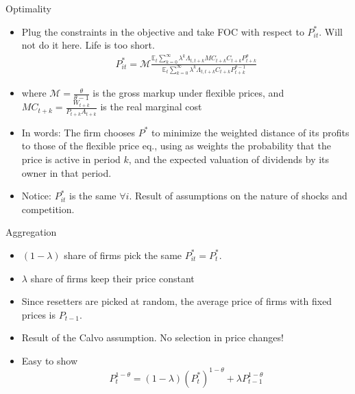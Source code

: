 \documentclass[11pt,aspectratio=169,xcolor={dvipsnames},hyperref={pdftex,pdfpagemode=UseNone,hidelinks,pdfdisplaydoctitle=true},usepdftitle=false]{beamer}
\begin{document}
\begin{frame}{Optimality}
\begin{itemize}
\item Plug the constraints in the objective and take FOC with respect to $P_{it}^*$. Will not do it here. Life is too short.
\begin{align*}
P^*_{it} = \mathcal{M} \frac{\mathbb{E}_t \sum_{k=0}^{\infty} \lambda^k \Lambda_{t,t+k} MC_{t+k} C_{t+k} P_{t+k}^{\theta}}{\mathbb{E}_t \sum_{k=0}^{\infty} \lambda^k \Lambda_{t,t+k} C_{t+k} P_{t+k}^{\theta-1}}
\end{align*}
\pause
\item where $\mathcal{M} = \frac{\theta}{\theta-1}$ is the gross markup under flexible prices, and $MC_{t+k} = \frac{W_{t+k}}{P_{t+k} A_{t+k}}$ is the real marginal cost
\item In words: The firm chooses $P^*$ to minimize the weighted distance of its profits to those of the flexible price eq., using as weights the probability that the price is active in period $k$, and the expected valuation of dividends by its owner in that period.
\pause
\item Notice: $P^*_{it}$ is the same $\forall i$. Result of assumptions on the nature of shocks and competition.
\end{itemize}
\end{frame}

\begin{frame}{Aggregation}
\begin{itemize}
\item $(1-\lambda)$ share of firms pick the same $P^*_{it} = P^*_t$.
\pause
\item $\lambda$ share of firms keep their price constant
\pause
\item Since resetters are picked at random, the average price of firms with fixed prices is $P_{t-1}$.
\pause
\item Result of the Calvo assumption. No selection in price changes!
\pause
\item Easy to show
$$P_t^{1-\theta} = (1-\lambda) (P^*_t)^{1-\theta} + \lambda P^{1-\theta}_{t-1}$$
\end{itemize}
\end{frame}
\end{document}
